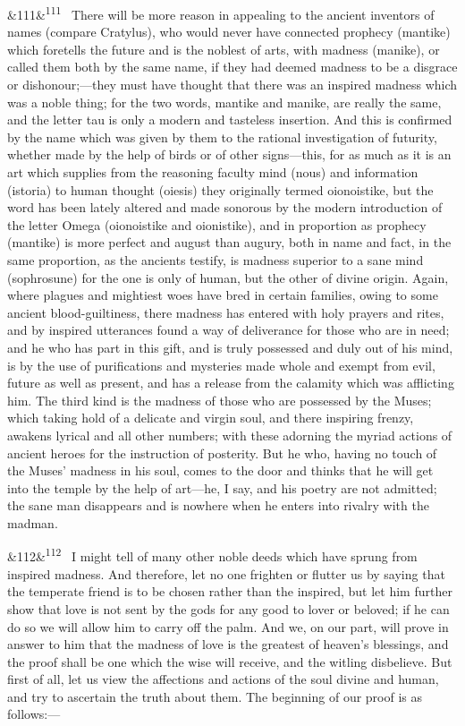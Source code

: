 \documentclass[12pt]{article}
\newcommand{\para}[1][]{\par\noindent\ifx&#1&\else\textsuperscript{\footnotesize #1}~\fi}
\begin{document}
\para[111] There will be more reason in appealing to the ancient inventors of names (compare Cratylus), who would never have connected prophecy (mantike) which foretells the future and is the noblest of arts, with madness (manike), or called them both by the same name, if they had deemed madness to be a disgrace or dishonour;---they must have thought that there was an inspired madness which was a noble thing; for the two words, mantike and manike, are really the same, and the letter tau is only a modern and tasteless insertion. And this is confirmed by the name which was given by them to the rational investigation of futurity, whether made by the help of birds or of other signs---this, for as much as it is an art which supplies from the reasoning faculty mind (nous) and information (istoria) to human thought (oiesis) they originally termed oionoistike, but the word has been lately altered and made sonorous by the modern introduction of the letter Omega (oionoistike and oionistike), and in proportion as prophecy (mantike) is more perfect and august than augury, both in name and fact, in the same proportion, as the ancients testify, is madness superior to a sane mind (sophrosune) for the one is only of human, but the other of divine origin. Again, where plagues and mightiest woes have bred in certain families, owing to some ancient blood-guiltiness, there madness has entered with holy prayers and rites, and by inspired utterances found a way of deliverance for those who are in need; and he who has part in this gift, and is truly possessed and duly out of his mind, is by the use of purifications and mysteries made whole and exempt from evil, future as well as present, and has a release from the calamity which was afflicting him. The third kind is the madness of those who are possessed by the Muses; which taking hold of a delicate and virgin soul, and there inspiring frenzy, awakens lyrical and all other numbers; with these adorning the myriad actions of ancient heroes for the instruction of posterity. But he who, having no touch of the Muses' madness in his soul, comes to the door and thinks that he will get into the temple by the help of art---he, I say, and his poetry are not admitted; the sane man disappears and is nowhere when he enters into rivalry with the madman.

\para[112] I might tell of many other noble deeds which have sprung from inspired madness. And therefore, let no one frighten or flutter us by saying that the temperate friend is to be chosen rather than the inspired, but let him further show that love is not sent by the gods for any good to lover or beloved; if he can do so we will allow him to carry off the palm. And we, on our part, will prove in answer to him that the madness of love is the greatest of heaven's blessings, and the proof shall be one which the wise will receive, and the witling disbelieve. But first of all, let us view the affections and actions of the soul divine and human, and try to ascertain the truth about them. The beginning of our proof is as follows:---
\end{document}
